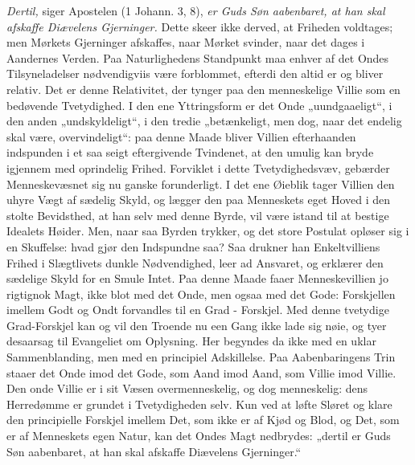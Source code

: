 \documentclass[12pt,a4paper]{book}
\begin{document}
\emph{Dertil,} siger Apostelen (1 Johann. 3, 8), \emph{er Guds Søn aabenbaret, at han
skal afskaffe Diævelens Gjerninger.} Dette skeer ikke derved, at Friheden voldtages; men
Mørkets Gjerninger afskaffes, naar Mørket svinder, naar det dages i Aandernes Verden. Paa
Naturlighedens Standpunkt maa enhver af det Ondes Tilsyneladelser nødvendigviis være
forblommet, efterdi den altid er og bliver relativ. Det er denne Relativitet, der tynger
paa den menneskelige Villie som en bedøvende Tvetydighed. I den ene Yttringsform er det
Onde „uundgaaeligt“, i den anden „undskyldeligt“, i den tredie „betænkeligt, men
dog, naar det endelig skal være, overvindeligt“: paa denne Maade bliver Villien
efterhaanden indspunden i et saa seigt eftergivende Tvindenet, at den umulig kan bryde
igjennem med oprindelig Frihed. Forviklet i dette Tvetydighedsvæv, gebærder
Menneskevæsnet sig nu ganske forunderligt. I det ene Øieblik tager Villien den uhyre Vægt
af sædelig Skyld, og lægger den paa Menneskets eget Hoved i den stolte Bevidsthed, at han
selv med denne Byrde, vil være istand til at bestige Idealets Høider. Men, naar saa Byrden
trykker, og det store Postulat opløser sig i en Skuffelse: hvad gjør den Indspundne saa?
Saa drukner han Enkeltvilliens Frihed i Slægtlivets dunkle Nødvendighed, leer ad
Ansvaret, og erklærer den sædelige Skyld for en Smule Intet. Paa denne Maade faaer
Menneskevillien jo rigtignok Magt, ikke blot med det Onde, men ogsaa med det Gode:
Forskjellen imellem Godt og Ondt forvandles til en Grad - Forskjel. Med denne tvetydige
Grad-Forskjel kan og vil den Troende nu een Gang ikke lade sig nøie, og tyer desaarsag til
Evangeliet om Oplysning. Her begyndes da ikke med en uklar Sammenblanding, men med en
principiel Adskillelse. Paa Aabenbaringens Trin staaer det Onde imod det Gode, som Aand
imod Aand, som Villie imod Villie. Den onde Villie er i sit Væsen overmenneskelig, og dog
menneskelig: dens Herredømme er grundet i Tvetydigheden selv. Kun ved at løfte Sløret og
klare den principielle Forskjel imellem Det, som ikke er af Kjød og Blod, og Det, som er
af Menneskets egen Natur, kan det Ondes Magt nedbrydes: „dertil er Guds Søn aabenbaret, at
han skal afskaffe Diævelens Gjerninger.“
\end{document}

